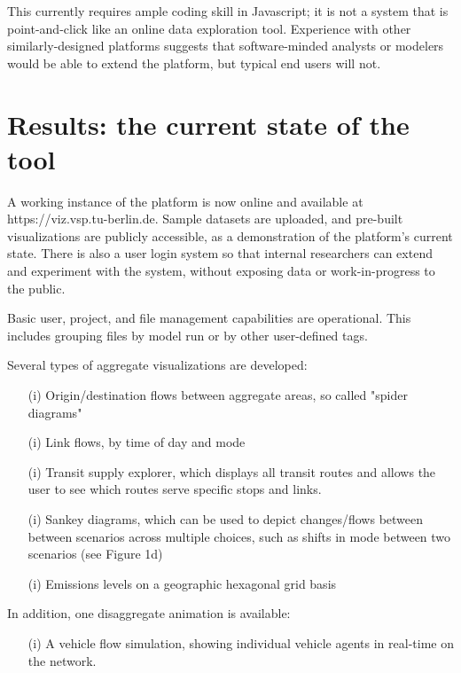 \documentclass[Afour,sageh,times]{sagej}
\begin{document}
This currently requires ample coding skill in Javascript; it is not a system that is point-and-click like an online data exploration tool. Experience with other similarly-designed platforms suggests that software-minded analysts or modelers would be able to extend the platform, but typical end users will not.

\section{Results: the current state of the tool}

A working instance of the platform is now online and available at https://viz.vsp.tu-berlin.de. Sample datasets are uploaded, and pre-built visualizations are publicly accessible, as a demonstration of the platform's current state. There is also a user login system so that internal researchers can extend and experiment with the system, without exposing data or work-in-progress to the public.

Basic user, project, and file management capabilities are operational. This includes grouping files by model run or by other user-defined tags.

Several types of aggregate visualizations are developed:

\begin{enumerate}

\item[(i)] Origin/destination flows between aggregate areas, so called "spider diagrams"
\item[(i)] Link flows, by time of day and mode
\item[(i)] Transit supply explorer, which displays all transit routes and allows the user to see which routes serve specific stops and links.
\item[(i)] Sankey diagrams, which can be used to depict changes/flows between between scenarios across multiple choices, such as shifts in mode between two scenarios (see Figure 1d)
\item[(i)] Emissions levels on a geographic hexagonal grid basis

\end{enumerate}

In addition, one disaggregate animation is available:

\begin{enumerate}
\item[(i)] A vehicle flow simulation, showing individual vehicle agents in real-time on the network.
\end{enumerate}
\end{document}
